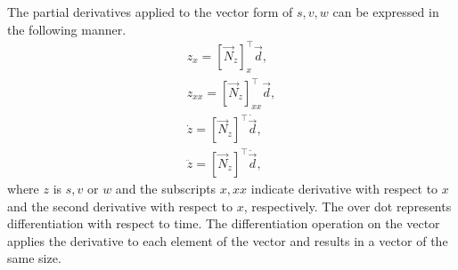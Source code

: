 The partial derivatives applied to the vector form of $s,v,w$ can be expressed in the following manner.
\begin{eqnarray}
z_x = [\vec N_z]_x^\top\vec d, \\
z_{xx} = [\vec N_z]_{xx}^\top\vec d, \\
\dot z = [\vec N_z]^\top\dot{\vec d}, \\
\ddot z = [\vec N_z]^\top\ddot{\vec d},
\end{eqnarray}
where $z$ is $s,v$ or $w$ and the subscripts $x,xx$ indicate derivative with respect to $x$ and the second derivative with respect to $x$, respectively. The over dot represents differentiation with respect to time. The differentiation operation on the vector applies the derivative to each element of the vector and results in a vector of the same size. 

